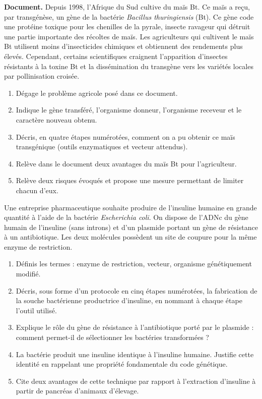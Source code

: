 \documentclass[11pt]{article}
\newcounter{popsec}
\newcounter{popsub}
\newcommand{\courssub}[1]{%
  \stepcounter{popsub}%
  \par\vspace{9pt}\noindent{\popxbold\fontsize{11.5}{13}\selectfont\color{popink}{\color{poporange}\thepopsec.\thepopsub}\hspace{6pt}#1}\par\nopagebreak\vspace{4pt}
}
\begin{document}
\courssub{Je me prépare au Probatoire}

\begin{exercice}
\textbf{Document.} Depuis 1998, l'Afrique du Sud cultive du maïs Bt. Ce maïs a reçu, par transgénèse, un gène de la bactérie \emph{Bacillus thuringiensis} (Bt). Ce gène code une protéine toxique pour les chenilles de la pyrale, insecte ravageur qui détruit une partie importante des récoltes de maïs. Les agriculteurs qui cultivent le maïs Bt utilisent moins d'insecticides chimiques et obtiennent des rendements plus élevés. Cependant, certains scientifiques craignent l'apparition d'insectes résistants à la toxine Bt et la dissémination du transgène vers les variétés locales par pollinisation croisée.
\begin{enumerate}
\item Dégage le problème agricole posé dans ce document.
\item Indique le gène transféré, l'organisme donneur, l'organisme receveur et le caractère nouveau obtenu.
\item Décris, en quatre étapes numérotées, comment on a pu obtenir ce maïs transgénique (outils enzymatiques et vecteur attendus).
\item Relève dans le document deux avantages du maïs Bt pour l'agriculteur.
\item Relève deux risques évoqués et propose une mesure permettant de limiter chacun d'eux.
\end{enumerate}
\end{exercice}

\begin{exercice}
Une entreprise pharmaceutique souhaite produire de l'insuline humaine en grande quantité à l'aide de la bactérie \emph{Escherichia coli}. On dispose de l'ADNc du gène humain de l'insuline (sans introns) et d'un plasmide portant un gène de résistance à un antibiotique. Les deux molécules possèdent un site de coupure pour la même enzyme de restriction.
\begin{enumerate}
\item Définis les termes : enzyme de restriction, vecteur, organisme génétiquement modifié.
\item Décris, sous forme d'un protocole en cinq étapes numérotées, la fabrication de la souche bactérienne productrice d'insuline, en nommant à chaque étape l'outil utilisé.
\item Explique le rôle du gène de résistance à l'antibiotique porté par le plasmide : comment permet-il de sélectionner les bactéries transformées ?
\item La bactérie produit une insuline identique à l'insuline humaine. Justifie cette identité en rappelant une propriété fondamentale du code génétique.
\item Cite deux avantages de cette technique par rapport à l'extraction d'insuline à partir de pancréas d'animaux d'élevage.
\end{enumerate}
\end{exercice}
\end{document}
